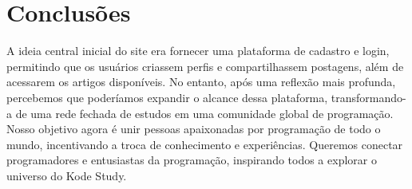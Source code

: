 \chapter{Conclusões}
\label{ch:conclusao}
	A ideia central inicial do site era fornecer uma plataforma de cadastro e login, permitindo que os usuários criassem perfis e compartilhassem postagens, além de acessarem os artigos disponíveis. No entanto, após uma reflexão mais profunda, percebemos que poderíamos expandir o alcance dessa plataforma, transformando-a de uma rede fechada de estudos em uma comunidade global de programação. Nosso objetivo agora é unir pessoas apaixonadas por programação de todo o mundo, incentivando a troca de conhecimento e experiências. Queremos conectar programadores e entusiastas da programação, inspirando todos a explorar o universo do Kode Study.